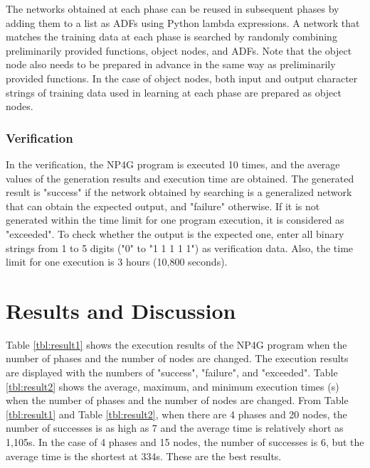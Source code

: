 \documentclass{article}
\begin{document}
The networks obtained at each phase can be reused in subsequent phases by adding them to a list as ADFs using Python lambda expressions.
A network that matches the training data at each phase is searched by randomly combining preliminarily provided functions, object nodes, and ADFs.
Note that the object node also needs to be prepared in advance in the same way as preliminarily provided functions.
In the case of object nodes, both input and output character strings of training data used in learning at each phase are prepared as object nodes.

\subsubsection {Verification}
In the verification, the NP4G program is executed 10 times, and the average values of the generation results and execution time are obtained.
The generated result is "success" if the network obtained by searching is a generalized network that can obtain the expected output, and "failure" otherwise. If it is not generated within the time limit for one program execution, it is considered as "exceeded".
To check whether the output is the expected one, enter all binary strings from 1 to 5 digits ("0" to "1 1 1 1 1") as verification data.
Also, the time limit for one execution is 3 hours (10,800 seconds).

\section {Results and Discussion}
Table \ref{tbl:result1} shows the execution results of the NP4G program when the number of phases and the number of nodes are changed.
The execution results are displayed with the numbers of "success", "failure", and "exceeded".
Table \ref{tbl:result2} shows the average, maximum, and minimum execution times (s) when the number of phases and the number of nodes are changed.
From Table \ref{tbl:result1} and Table \ref{tbl:result2}, when there are 4 phases and 20 nodes, the number of successes is as high as 7 and the average time is relatively short as 1,105s.
In the case of 4 phases and 15 nodes, the number of successes is 6, but the average time is the shortest at 334s.
These are the best results.
\end{document}
